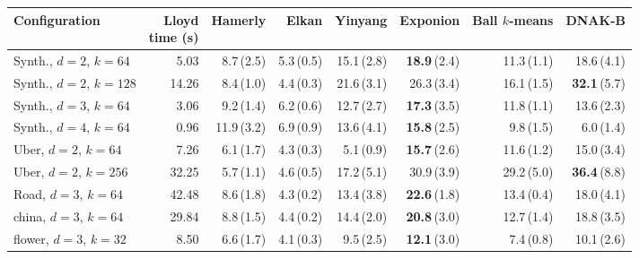 \begin{tabular}{lrrrrrrr}
\toprule
Configuration & \shortstack[r]{Lloyd\\ time (s)} & Hamerly & Elkan & Yinyang & Exponion & \shortstack[r]{Ball\\ $k$-means} & DNAK-B \\
\midrule
Synth., $d{=}2$, $k{=}64$ & 5.03 & 8.7\,{\scriptsize(2.5)} & 5.3\,{\scriptsize(0.5)} & 15.1\,{\scriptsize(2.8)} & \textbf{18.9}\,{\scriptsize(2.4)} & 11.3\,{\scriptsize(1.1)} & 18.6\,{\scriptsize(4.1)} \\
Synth., $d{=}2$, $k{=}128$ & 14.26 & 8.4\,{\scriptsize(1.0)} & 4.4\,{\scriptsize(0.3)} & 21.6\,{\scriptsize(3.1)} & 26.3\,{\scriptsize(3.4)} & 16.1\,{\scriptsize(1.5)} & \textbf{32.1}\,{\scriptsize(5.7)} \\
Synth., $d{=}3$, $k{=}64$ & 3.06 & 9.2\,{\scriptsize(1.4)} & 6.2\,{\scriptsize(0.6)} & 12.7\,{\scriptsize(2.7)} & \textbf{17.3}\,{\scriptsize(3.5)} & 11.8\,{\scriptsize(1.1)} & 13.6\,{\scriptsize(2.3)} \\
Synth., $d{=}4$, $k{=}64$ & 0.96 & 11.9\,{\scriptsize(3.2)} & 6.9\,{\scriptsize(0.9)} & 13.6\,{\scriptsize(4.1)} & \textbf{15.8}\,{\scriptsize(2.5)} & 9.8\,{\scriptsize(1.5)} & 6.0\,{\scriptsize(1.4)} \\
Uber, $d{=}2$, $k{=}64$ & 7.26 & 6.1\,{\scriptsize(1.7)} & 4.3\,{\scriptsize(0.3)} & 5.1\,{\scriptsize(0.9)} & \textbf{15.7}\,{\scriptsize(2.6)} & 11.6\,{\scriptsize(1.2)} & 15.0\,{\scriptsize(3.4)} \\
Uber, $d{=}2$, $k{=}256$ & 32.25 & 5.7\,{\scriptsize(1.1)} & 4.6\,{\scriptsize(0.5)} & 17.2\,{\scriptsize(5.1)} & 30.9\,{\scriptsize(3.9)} & 29.2\,{\scriptsize(5.0)} & \textbf{36.4}\,{\scriptsize(8.8)} \\
Road, $d{=}3$, $k{=}64$ & 42.48 & 8.6\,{\scriptsize(1.8)} & 4.3\,{\scriptsize(0.2)} & 13.4\,{\scriptsize(3.8)} & \textbf{22.6}\,{\scriptsize(1.8)} & 13.4\,{\scriptsize(0.4)} & 18.0\,{\scriptsize(4.1)} \\
china, $d{=}3$, $k{=}64$ & 29.84 & 8.8\,{\scriptsize(1.5)} & 4.4\,{\scriptsize(0.2)} & 14.4\,{\scriptsize(2.0)} & \textbf{20.8}\,{\scriptsize(3.0)} & 12.7\,{\scriptsize(1.4)} & 18.8\,{\scriptsize(3.5)} \\
flower, $d{=}3$, $k{=}32$ & 8.50 & 6.6\,{\scriptsize(1.7)} & 4.1\,{\scriptsize(0.3)} & 9.5\,{\scriptsize(2.5)} & \textbf{12.1}\,{\scriptsize(3.0)} & 7.4\,{\scriptsize(0.8)} & 10.1\,{\scriptsize(2.6)} \\
\bottomrule
\end{tabular}
